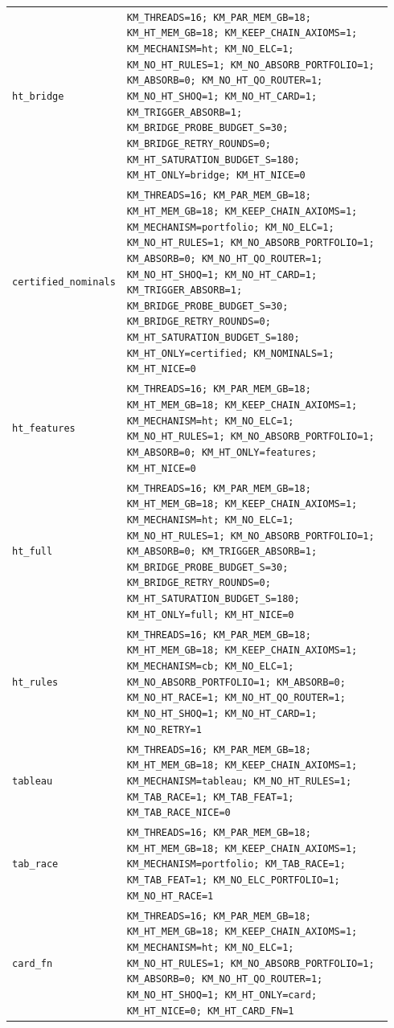 \begin{longtable}{@{}p{0.18\linewidth}p{0.76\linewidth}@{}}
\texttt{ht\_bridge} & \texttt{KM\_THREADS=16; KM\_PAR\_MEM\_GB=18; KM\_HT\_MEM\_GB=18; KM\_KEEP\_CHAIN\_AXIOMS=1; KM\_MECHANISM=ht; KM\_NO\_ELC=1; KM\_NO\_HT\_RULES=1; KM\_NO\_ABSORB\_PORTFOLIO=1; KM\_ABSORB=0; KM\_NO\_HT\_QO\_ROUTER=1; KM\_NO\_HT\_SHOQ=1; KM\_NO\_HT\_CARD=1; KM\_TRIGGER\_ABSORB=1; KM\_BRIDGE\_PROBE\_BUDGET\_S=30; KM\_BRIDGE\_RETRY\_ROUNDS=0; KM\_HT\_SATURATION\_BUDGET\_S=180; KM\_HT\_ONLY=bridge; KM\_HT\_NICE=0} \\
\texttt{certified\_nominals} & \texttt{KM\_THREADS=16; KM\_PAR\_MEM\_GB=18; KM\_HT\_MEM\_GB=18; KM\_KEEP\_CHAIN\_AXIOMS=1; KM\_MECHANISM=portfolio; KM\_NO\_ELC=1; KM\_NO\_HT\_RULES=1; KM\_NO\_ABSORB\_PORTFOLIO=1; KM\_ABSORB=0; KM\_NO\_HT\_QO\_ROUTER=1; KM\_NO\_HT\_SHOQ=1; KM\_NO\_HT\_CARD=1; KM\_TRIGGER\_ABSORB=1; KM\_BRIDGE\_PROBE\_BUDGET\_S=30; KM\_BRIDGE\_RETRY\_ROUNDS=0; KM\_HT\_SATURATION\_BUDGET\_S=180; KM\_HT\_ONLY=certified; KM\_NOMINALS=1; KM\_HT\_NICE=0} \\
\texttt{ht\_features} & \texttt{KM\_THREADS=16; KM\_PAR\_MEM\_GB=18; KM\_HT\_MEM\_GB=18; KM\_KEEP\_CHAIN\_AXIOMS=1; KM\_MECHANISM=ht; KM\_NO\_ELC=1; KM\_NO\_HT\_RULES=1; KM\_NO\_ABSORB\_PORTFOLIO=1; KM\_ABSORB=0; KM\_HT\_ONLY=features; KM\_HT\_NICE=0} \\
\texttt{ht\_full} & \texttt{KM\_THREADS=16; KM\_PAR\_MEM\_GB=18; KM\_HT\_MEM\_GB=18; KM\_KEEP\_CHAIN\_AXIOMS=1; KM\_MECHANISM=ht; KM\_NO\_ELC=1; KM\_NO\_HT\_RULES=1; KM\_NO\_ABSORB\_PORTFOLIO=1; KM\_ABSORB=0; KM\_TRIGGER\_ABSORB=1; KM\_BRIDGE\_PROBE\_BUDGET\_S=30; KM\_BRIDGE\_RETRY\_ROUNDS=0; KM\_HT\_SATURATION\_BUDGET\_S=180; KM\_HT\_ONLY=full; KM\_HT\_NICE=0} \\
\texttt{ht\_rules} & \texttt{KM\_THREADS=16; KM\_PAR\_MEM\_GB=18; KM\_HT\_MEM\_GB=18; KM\_KEEP\_CHAIN\_AXIOMS=1; KM\_MECHANISM=cb; KM\_NO\_ELC=1; KM\_NO\_ABSORB\_PORTFOLIO=1; KM\_ABSORB=0; KM\_NO\_HT\_RACE=1; KM\_NO\_HT\_QO\_ROUTER=1; KM\_NO\_HT\_SHOQ=1; KM\_NO\_HT\_CARD=1; KM\_NO\_RETRY=1} \\
\texttt{tableau} & \texttt{KM\_THREADS=16; KM\_PAR\_MEM\_GB=18; KM\_HT\_MEM\_GB=18; KM\_KEEP\_CHAIN\_AXIOMS=1; KM\_MECHANISM=tableau; KM\_NO\_HT\_RULES=1; KM\_TAB\_RACE=1; KM\_TAB\_FEAT=1; KM\_TAB\_RACE\_NICE=0} \\
\texttt{tab\_race} & \texttt{KM\_THREADS=16; KM\_PAR\_MEM\_GB=18; KM\_HT\_MEM\_GB=18; KM\_KEEP\_CHAIN\_AXIOMS=1; KM\_MECHANISM=portfolio; KM\_TAB\_RACE=1; KM\_TAB\_FEAT=1; KM\_NO\_ELC\_PORTFOLIO=1; KM\_NO\_HT\_RACE=1} \\
\texttt{card\_fn} & \texttt{KM\_THREADS=16; KM\_PAR\_MEM\_GB=18; KM\_HT\_MEM\_GB=18; KM\_KEEP\_CHAIN\_AXIOMS=1; KM\_MECHANISM=ht; KM\_NO\_ELC=1; KM\_NO\_HT\_RULES=1; KM\_NO\_ABSORB\_PORTFOLIO=1; KM\_ABSORB=0; KM\_NO\_HT\_QO\_ROUTER=1; KM\_NO\_HT\_SHOQ=1; KM\_HT\_ONLY=card; KM\_HT\_NICE=0; KM\_HT\_CARD\_FN=1} \\

\end{longtable}
